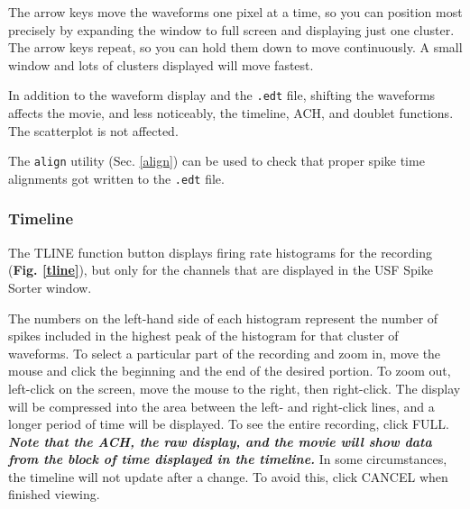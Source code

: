 \documentclass[12pt]{article}
\begin{document}
The arrow keys move the waveforms one pixel at a time, so you can
position most precisely by expanding the window to full screen and
displaying just one cluster.  The arrow keys repeat, so you can hold
them down to move continuously.  A small window and lots of clusters
displayed will move fastest.

In addition to the waveform display and the {\tt .edt} file, shifting
the waveforms affects the movie, and less noticeably, the timeline,
ACH, and doublet functions.  The scatterplot is not affected.

The {\tt align} utility (Sec. \ref{align}) can be used to check that
proper spike time alignments got written to the {\tt .edt} file.

\subsubsection{Timeline}
\label{timeline}
The {\sf TLINE} function button displays firing rate histograms for
the recording (\textbf{Fig. \ref{tline}}), but only for the channels
that are displayed in the USF Spike Sorter window.
\begin{center}
  \label{tline}
\end{center}
The numbers on the left-hand side of each histogram represent the
number of spikes included in the highest peak of the histogram for
that cluster of waveforms. To select a particular part of the
recording and zoom in, move the mouse and click the beginning and the
end of the desired portion. To zoom out, left-click on the screen,
move the mouse to the right, then right-click. The display will be
compressed into the area between the left- and right-click lines, and
a longer period of time will be displayed. To see the entire
recording, click {\sf FULL}. \textbf{\textit{Note that the ACH, the
    raw display, and the movie will show data from the block of time
    displayed in the timeline.}} In some circumstances, the timeline
will not update after a change. To avoid this, click {\sf CANCEL} when
finished viewing.
\end{document}
